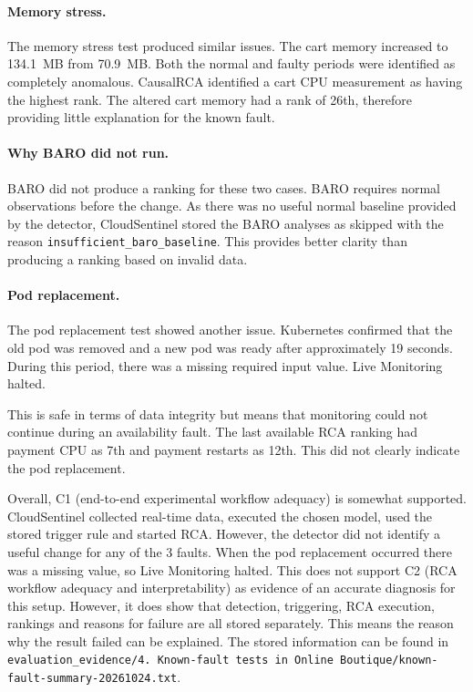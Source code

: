\paragraph{Memory stress.}

The memory stress test produced similar issues. The cart memory increased to 134.1~MB from 70.9~MB. Both the normal and faulty periods were identified as completely anomalous. CausalRCA identified a cart CPU measurement as having the highest rank. The altered cart memory had a rank of 26th, therefore providing little explanation for the known fault.

\paragraph{Why BARO did not run.}

BARO did not produce a ranking for these two cases. BARO requires normal observations before the change. As there was no useful normal baseline provided by the detector, CloudSentinel stored the BARO analyses as skipped with the reason \texttt{insufficient\_baro\_baseline}. This provides better clarity than producing a ranking based on invalid data.

\paragraph{Pod replacement.}

The pod replacement test showed another issue. Kubernetes confirmed that the old pod was removed and a new pod was ready after approximately 19 seconds. During this period, there was a missing required input value. Live Monitoring halted.

This is safe in terms of data integrity but means that monitoring could not continue during an availability fault. The last available RCA ranking had payment CPU as 7th and payment restarts as 12th. This did not clearly indicate the pod replacement.

Overall, C1 (end-to-end experimental workflow adequacy) is somewhat supported. CloudSentinel collected real-time data, executed the chosen model, used the stored trigger rule and started RCA. However, the detector did not identify a useful change for any of the 3 faults. When the pod replacement occurred there was a missing value, so Live Monitoring halted. This does not support C2 (RCA workflow adequacy and interpretability) as evidence of an accurate diagnosis for this setup. However, it does show that detection, triggering, RCA execution, rankings and reasons for failure are all stored separately. This means the reason why the result failed can be explained. The stored information can be found in \texttt{evaluation\_evidence/4. Known-fault tests in Online Boutique/known-fault-summary-20261024.txt}.

